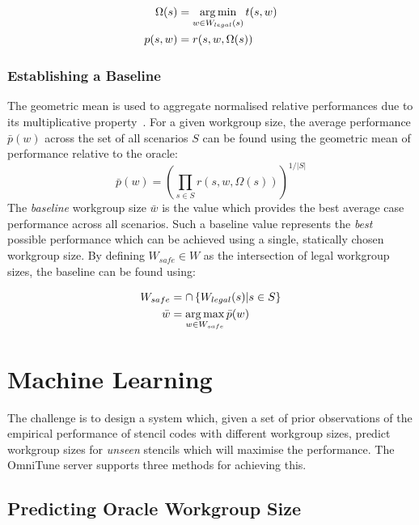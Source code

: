 \begin{align}
  \Omega(s) &= \operatorname*{arg\,min}_{w \in W_{legal}(s)} t(s,w)\\
  p(s,w) &= r(s, w, \Omega(s))
\end{align}


\subsubsection{Establishing a Baseline}

The geometric mean is used to aggregate normalised relative
performances due to its multiplicative
property~\cite{Fleming1986}. For a given workgroup size, the average
performance $\bar{p}(w)$ across the set of all scenarios $S$ can be
found using the geometric mean of performance relative to the oracle:
%
\begin{equation}
\bar{p}(w) =
\left(
  \prod_{s \in S} r(s, w, \Omega(s))
\right)^{1/|S|}
\end{equation}
%
The \emph{baseline} workgroup size $\bar{w}$ is the value which
provides the best average case performance across all scenarios. Such
a baseline value represents the \emph{best} possible performance which
can be achieved using a single, statically chosen workgroup size. By
defining $W_{safe} \in W$ as the intersection of legal workgroup
sizes, the baseline can be found using:

\begin{align}
W_{safe} &= \cap \left\{ W_{legal}(s) | s \in S \right\}\\
\bar{w} &= \operatorname*{arg\,max}_{w \in W_{safe}} \bar{p}(w)
\end{align}


\section{Machine Learning}\label{sec:omnitune-ml}

The challenge is to design a system which, given a set of prior
observations of the empirical performance of stencil codes with
different workgroup sizes, predict workgroup sizes for \emph{unseen}
stencils which will maximise the performance. The OmniTune server
supports three methods for achieving this.


\subsection{Predicting Oracle Workgroup Size}\label{subsec:omnitune-ml-class}

